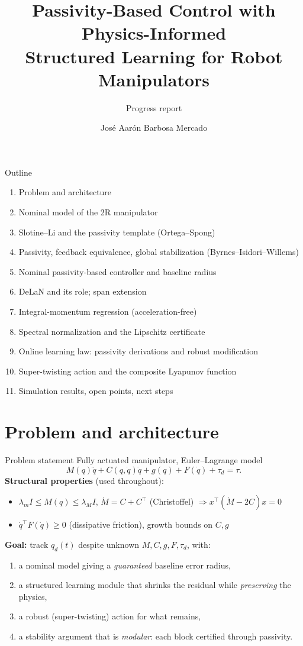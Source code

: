\documentclass[aspectratio=169,10pt]{beamer}
\title[PBC + Structured Learning]{Passivity-Based Control with Physics-Informed\\Structured Learning for Robot Manipulators}
\subtitle{Progress report}
\author{José Aarón Barbosa Mercado}
\institute[CINVESTAV]{CINVESTAV-IPN\\[2pt]\small Advisors: Dr.\ Wen Yu Liu \;\&\; Dr.\ Fernando Castaños Luna}
\date{}
\newcommand{\dq}{\dot q}
\begin{document}
\begin{frame}\titlepage\end{frame}

\begin{frame}{Outline}
\begin{enumerate}\setlength\itemsep{3pt}
\item Problem and architecture
\item Nominal model of the 2R manipulator
\item Slotine--Li and the passivity template (Ortega--Spong)
\item Passivity, feedback equivalence, global stabilization (Byrnes--Isidori--Willems)
\item Nominal passivity-based controller and baseline radius
\item DeLaN and its role; span extension
\item Integral-momentum regression (acceleration-free)
\item Spectral normalization and the Lipschitz certificate
\item Online learning law: passivity derivations and robust modification
\item Super-twisting action and the composite Lyapunov function
\item Simulation results, open points, next steps
\end{enumerate}
\end{frame}

\section{Problem and architecture}
\begin{frame}{Problem statement}
Fully actuated manipulator, Euler--Lagrange model
\[
M(q)\ddot q + C(q,\dq)\dq + g(q) + F(\dq) + \tau_d = \tau .
\]
\textbf{Structural properties} (used throughout):
\begin{itemize}
\item $\lambda_m I \le M(q)\le \lambda_M I$, \quad $\dot M = C + C^\top$ (Christoffel) $\Rightarrow x^\top(\dot M-2C)x=0$
\item $\dq^\top F(\dq)\ge 0$ (dissipative friction), growth bounds on $C,g$
\end{itemize}
\textbf{Goal:} track $q_d(t)$ despite unknown $M,C,g,F,\tau_d$, with:
\begin{enumerate}
\item a nominal model giving a \emph{guaranteed} baseline error radius,
\item a structured learning module that shrinks the residual while \emph{preserving} the physics,
\item a robust (super-twisting) action for what remains,
\item a stability argument that is \emph{modular}: each block certified through passivity.
\end{enumerate}
\end{frame}
\end{document}
